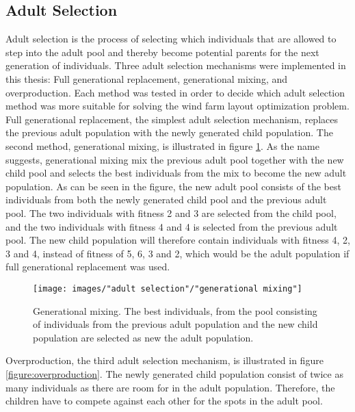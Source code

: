 \subsection{Adult Selection}\label{subsection:adult selection}
Adult selection is the process of selecting which individuals that are allowed to step into the adult pool and thereby become potential parents for the next generation of individuals. Three adult selection mechanisms were implemented in this thesis: Full generational replacement,  generational mixing, and overproduction. Each method was tested in order to decide which adult selection method was more suitable for solving the wind farm layout optimization problem. \\

\noindent Full generational replacement, the simplest adult selection mechanism, replaces the previous adult population with the newly generated child population. The second method, generational mixing, is illustrated in figure \ref{figure:generational mixing}. As the name suggests, generational mixing mix the previous adult pool together with the new child pool and selects the best individuals from the mix to become the new adult population. As can be seen in the figure, the new adult pool consists of the best individuals from both the newly generated child pool and the previous adult pool. The two individuals with fitness 2 and 3 are selected from the child pool, and the two individuals with fitness 4 and 4 is selected from the previous adult pool. The new child population will therefore contain individuals with fitness 4, 2, 3 and 4, instead of fitness of 5, 6, 3 and 2, which would be the adult population if full generational replacement was used. \\


\begin{figure}[h!]
\begin{center}
\texttt{[image: images/"adult selection"/"generational mixing"]}
\caption{Generational mixing. The best individuals, from the pool consisting of individuals from the previous adult population and the new child population are selected as new the adult population.}
\label{figure:generational mixing}
\end{center}
\end{figure}


\noindent Overproduction, the third adult selection mechanism, is illustrated in figure \ref{figure:overproduction}. The newly generated child population consist of twice as many individuals as there are room for in the adult population. Therefore, the children have to compete against each other for the spots in the adult pool. \\


